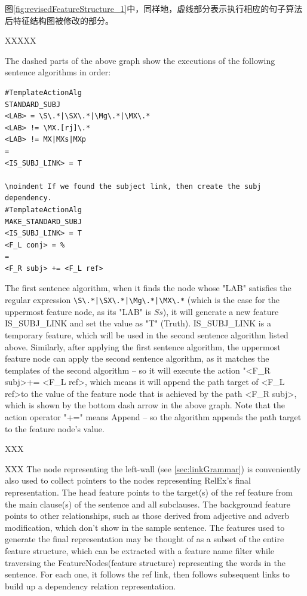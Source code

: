 图\ref{fig:revisedFeatureStructure_1}中，同样地，虚线部分表示执行相应的句子算法后特征结构图被修改的部分。


XXXXX

The dashed parts of the above graph show the executions of the following sentence algorithms in order:

\begin{verbatim}
#TemplateActionAlg
STANDARD_SUBJ
<LAB> = \S\.*|\SX\.*|\Mg\.*|\MX\.*
<LAB> != \MX.[rj]\.*
<LAB> != MX|MXs|MXp
=
<IS_SUBJ_LINK> = T

\noindent If we found the subject link, then create the subj dependency.
#TemplateActionAlg
MAKE_STANDARD_SUBJ
<IS_SUBJ_LINK> = T
<F_L conj> = %
=
<F_R subj> += <F_L ref>
\end{verbatim}

The first sentence algorithm, when it finds the node whose "LAB" satisfies the regular expression \verb§\S\.*|\SX\.*|\Mg\.*|\MX\.*§ (which is the case for the uppermost feature node, as its "LAB" is $Ss$), it will generate a new feature IS\_SUBJ\_LINK and set the value as "T" (Truth).  IS\_SUBJ\_LINK is a temporary feature, which will be used in the second sentence algorithm listed above. Similarly, after applying the first sentence algorithm, the uppermost feature node can apply the second sentence algorithm, as it matches the templates of the second algorithm -- so it will execute the action "\textless F\_R subj\textgreater += \textless F\_L ref\textgreater, which means it will append the path target of \textless F\_L ref\textgreater to the value of the feature node that is achieved by the path \textless F\_R subj\textgreater, which is shown by the bottom dash arrow in the above graph. Note that the action operator "+=" means Append -- so the algorithm appends the path target to the feature node's value.

XXX



XXX
The node representing the left-wall (see \ref{sec:linkGrammar}) is conveniently also used to collect pointers to the nodes representing RelEx's final representation. The head feature points to the target(s) of the ref feature from the main clause(s) of the sentence and all subclauses. The background feature points to other relationships, such as those derived from adjective and adverb modification, which don't show in the sample sentence. The features used to generate the final representation may be thought of as a subset of the entire feature structure, which can be extracted with a feature name filter while traversing the FeatureNodes(feature structure) representing the words in the sentence. For each one, it follows the ref link, then follows subsequent links to build up a dependency relation representation. 

